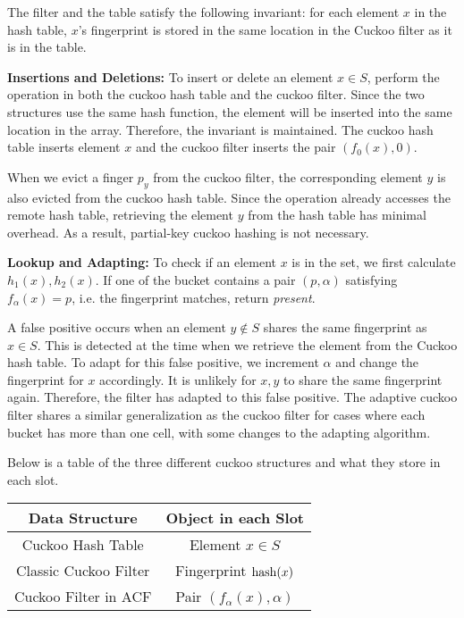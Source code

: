 \documentclass[../paper.tex]{subfiles}
\begin{document}
The filter and the table satisfy the following invariant: for each element $x$ in the hash table, $x$'s fingerprint is stored in the same location in the Cuckoo filter as it is in the table.

\textbf{Insertions and Deletions:} To insert or delete an element $x\in S$, perform the operation in both the cuckoo hash table and the cuckoo filter.
Since the two structures use the same hash function, the element will be inserted into the same location in the array. Therefore, the invariant is maintained.
The cuckoo hash table inserts element $x$ and the cuckoo filter inserts the pair $(f_0(x),0)$.

When we evict a finger $p_y$ from the cuckoo filter, the corresponding element $y$ is also evicted from the cuckoo hash table.
Since the operation already accesses the remote hash table, retrieving the element $y$ from the hash table has minimal overhead. As a result, partial-key cuckoo hashing is not necessary.

\textbf{Lookup and Adapting:} To check if an element $x$ is in the set, we first calculate $h_1(x), h_2(x)$. If one of the bucket contains a pair $(p,\alpha)$ satisfying $f_\alpha(x)=p$, i.e. the fingerprint matches, return \textit{present}.

A false positive occurs when an element $y\not\in S$ shares the same fingerprint as $x\in S$. This is detected at the time when we retrieve the element from the
Cuckoo hash table. To adapt for this false positive, we increment $\alpha$ and change the fingerprint for $x$ accordingly. It is unlikely for $x,y$ to share the same fingerprint again.
Therefore, the filter has adapted to this false positive. The adaptive cuckoo filter shares a similar generalization as the cuckoo filter for cases where each bucket has more than one cell, with some changes to the adapting algorithm.

Below is a table of the three different cuckoo structures and what they store in each slot.

\begin{table}
\centering
\begin{tabular}{|c|c|}
\hline  Data Structure & Object in each Slot \\
\hline Cuckoo Hash Table & Element $x\in S$ \\
\hline Classic Cuckoo Filter & Fingerprint $\operatorname{hash}(x)$ \\
\hline Cuckoo Filter in ACF & Pair $(f_\alpha(x),\alpha)$ \\ \hline
\end{tabular}
\end{table}
\end{document}
